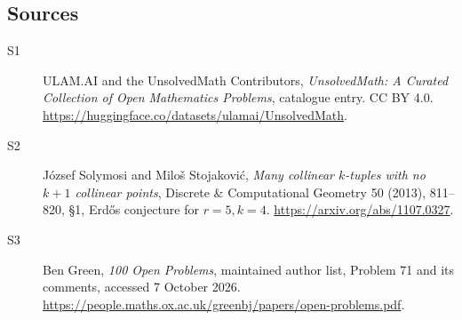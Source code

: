 \documentclass[11pt]{article}
\begin{document}
\subsection{Sources}
\begin{description}
\item[\hypertarget{source:statement:1}{S1}] ULAM.AI and the UnsolvedMath Contributors, \emph{UnsolvedMath: A Curated Collection of Open Mathematics Problems}, catalogue entry. CC BY 4.0. \url{https://huggingface.co/datasets/ulamai/UnsolvedMath}.
\item[\hypertarget{source:statement:2}{S2}] József Solymosi and Miloš Stojaković, \emph{Many collinear $k$-tuples with no $k+1$ collinear points}, Discrete \& Computational Geometry 50 (2013), 811--820, §1, Erdős conjecture for $r=5,k=4$. \url{https://arxiv.org/abs/1107.0327}.
\item[\hypertarget{source:statement:3}{S3}] Ben Green, \emph{100 Open Problems}, maintained author list, Problem 71 and its comments, accessed 7 October 2026. \url{https://people.maths.ox.ac.uk/greenbj/papers/open-problems.pdf}.
\end{description}
\label{end:statement}
\end{document}
